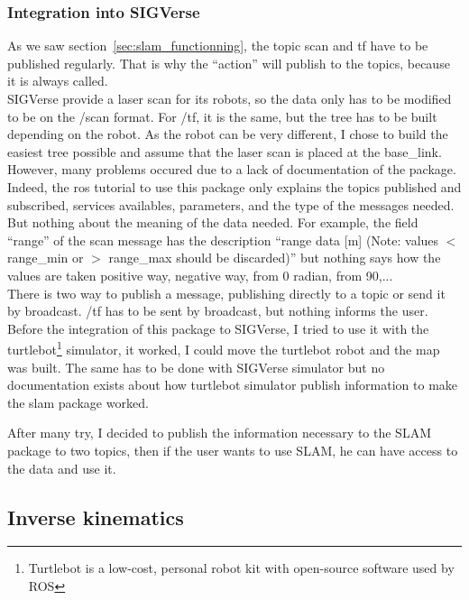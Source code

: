 \subsubsection{Integration into SIGVerse}
As we saw section~\ref{sec:slam_functionning}, the topic scan and tf have to be published regularly. That is why the ``action'' will publish to the topics, because it is always called.\\
SIGVerse provide a laser scan for its robots, so the data only has to be modified to be on the /scan format.
For /tf, it is the same, but the tree has to be built depending on the robot. As the robot can be very different, I chose to build the easiest tree possible and assume that the laser scan is placed at the base\_link.\\

However, many problems occured due to a lack of documentation of the package. Indeed, the ros tutorial to use this package only explains the topics published and subscribed, services availables, parameters, and the type of the messages needed. But nothing about the meaning of the data needed. For example, the field ``range'' of the scan message has the description ``range data [m] (Note: values $<$ range\_min or $>$ range\_max should be discarded)'' but nothing says how the values are taken positive way, negative way, from 0 radian, from 90,...\\

There is two way to publish a message, publishing directly to a topic or send it by broadcast. /tf has to be sent by broadcast, but nothing informs the user.\\

Before the integration of this package to SIGVerse, I tried to use it with the turtlebot\footnote{Turtlebot is a low-cost, personal robot kit with open-source software used by ROS} simulator, it worked, I could move the turtlebot robot and the map was built. The same has to be done with SIGVerse simulator but no documentation exists about how turtlebot simulator publish information to make the slam package worked.

After many try, I decided to publish the information necessary to the SLAM package to two topics, then if the user wants to use SLAM, he can have access to the data and use it.

\subsection{Inverse kinematics}
